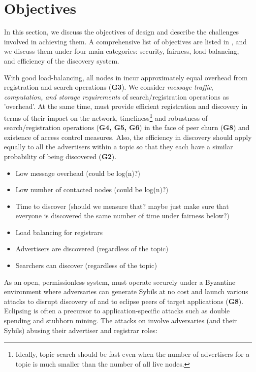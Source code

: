 \section{Objectives}
\label{sec:objectives}

In this section, we discuss the objectives of \sysname design and describe the challenges involved in achieving them. A comprehensive list of objectives are listed in , and we discuss them under four main categories: security, fairness, load-balancing, and efficiency of the discovery system.


 With good load-balancing, all nodes in \sysname incur approximately equal overhead from registration and search operations (\textbf{G3}). We consider \textit{message traffic, computation, and storage requirements} of search/registration operations as 'overhead'. At the same time, \sysname must provide efficient registration and discovery in terms of their impact on the network, timeliness\footnote{Ideally, topic search should be fast even when the number of advertisers for a topic is much smaller than the number of all live nodes.} and robustness of search/registration operations (\textbf{G4, G5, G6}) in the face of peer churn (\textbf{G8}) and existence of access control measures. Also, the efficiency in discovery should apply equally to all the advertisers within a topic so that they each have a similar probability of being discovered (\textbf{G2}).
\begin{itemize}
    \item Low message overhead (could be log(n)?)
    \item Low number of contacted nodes (could be log(n)?)
    \item Time to discover (should we measure that? maybe just make sure that everyone is discovered the same number of time under fairness below?)
\end{itemize}


\begin{itemize}
    \item Load balancing for registrars
    \item Advertisers are discovered (regardless of the topic)
    \item Searchers can discover (regardless of the topic)
\end{itemize}

 As an open, permissionless system, \sysname must operate securely under a Byzantine environment where adversaries can generate Sybils at no cost and launch various attacks to disrupt discovery of and to eclipse peers of target applications (\textbf{G8}). Eclipsing is often a precursor to application-specific attacks such as double spending and stubborn mining. The attacks on \sysname involve adversaries (and their Sybils) abusing their advertiser and registrar roles:

